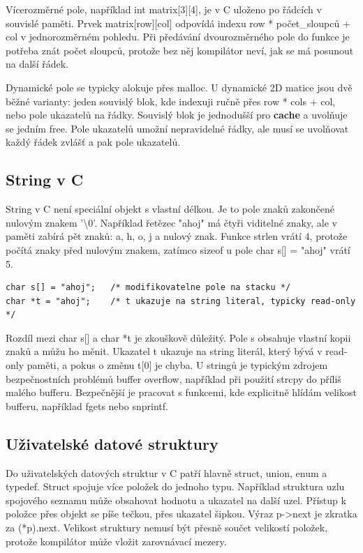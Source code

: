 Vícerozměrné pole, například int matrix[3][4], je v C uloženo po řádcích v souvislé paměti. Prvek matrix[row][col] odpovídá indexu row * počet\_sloupců + col v jednorozměrném pohledu. Při předávání dvourozměrného pole do funkce je potřeba znát počet sloupců, protože bez něj kompilátor neví, jak se má posunout na další řádek.

Dynamické pole se typicky alokuje přes malloc. U dynamické 2D matice jsou dvě běžné varianty: jeden souvislý blok, kde indexuji ručně přes row * cols + col, nebo pole ukazatelů na řádky. Souvislý blok je jednodušší pro \textbf{cache} a uvolňuje se jedním free. Pole ukazatelů umožní nepravidelné řádky, ale musí se uvolňovat každý řádek zvlášť a pak pole ukazatelů.

\subsection*{String v C}

String v C není speciální objekt s vlastní délkou. Je to pole znaků zakončené nulovým znakem '\textbackslash{}0'. Například řetězec "ahoj" má čtyři viditelné znaky, ale v paměti zabírá pět znaků: a, h, o, j a nulový znak. Funkce strlen vrátí 4, protože počítá znaky před nulovým znakem, zatímco sizeof u pole char s[] = "ahoj" vrátí 5.

\begin{codebox}
\small
\begin{verbatim}
char s[] = "ahoj";   /* modifikovatelne pole na stacku */
char *t = "ahoj";    /* t ukazuje na string literal, typicky read-only */
\end{verbatim}
\end{codebox}

Rozdíl mezi char s[] a char *t je zkouškově důležitý. Pole s obsahuje vlastní kopii znaků a můžu ho měnit. Ukazatel t ukazuje na string literál, který bývá v read-only paměti, a pokus o změnu t[0] je chyba. U stringů je typickým zdrojem bezpečnostních problémů buffer overflow, například při použití strcpy do příliš malého bufferu. Bezpečnější je pracovat s funkcemi, kde explicitně hlídám velikost bufferu, například fgets nebo snprintf.

\subsection*{Uživatelské datové struktury}

Do uživatelských datových struktur v C patří hlavně struct, union, enum a typedef. Struct spojuje více položek do jednoho typu. Například struktura uzlu spojového seznamu může obsahovat hodnotu a ukazatel na další uzel. Přístup k položce přes objekt se píše tečkou, přes ukazatel šipkou. Výraz p->next je zkratka za (*p).next. Velikost struktury nemusí být přesně součet velikostí položek, protože kompilátor může vložit zarovnávací mezery.

